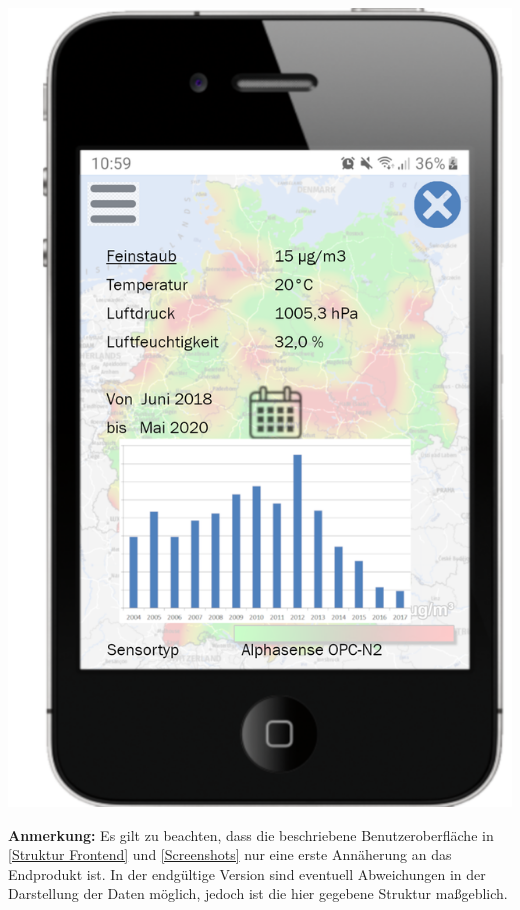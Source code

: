 \begin{center}
    \includegraphics[scale=0.5]{media/AktuelleDaten-Mobile-Version}   
\end{center}

\textbf{Anmerkung:}
Es gilt zu beachten, dass die beschriebene Benutzeroberfläche in \autoref{Struktur Frontend} und \autoref{Screenshots} nur eine erste Annäherung an das Endprodukt ist. In der endgültige Version sind eventuell Abweichungen in der Darstellung der Daten möglich, jedoch ist die hier gegebene Struktur maßgeblich.
